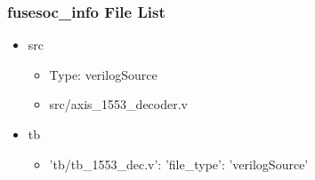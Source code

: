\subsubsection{fusesoc\_info File List}
\begin{itemize}
\item src
	\begin{itemize}
	\item[$\space$] Type: verilogSource
	\item src/axis\_1553\_decoder.v
	\end{itemize}
\item tb
	\begin{itemize}
	\item {'tb/tb\_1553\_dec.v': {'file\_type': 'verilogSource'}}
	\end{itemize}
\end{itemize}
